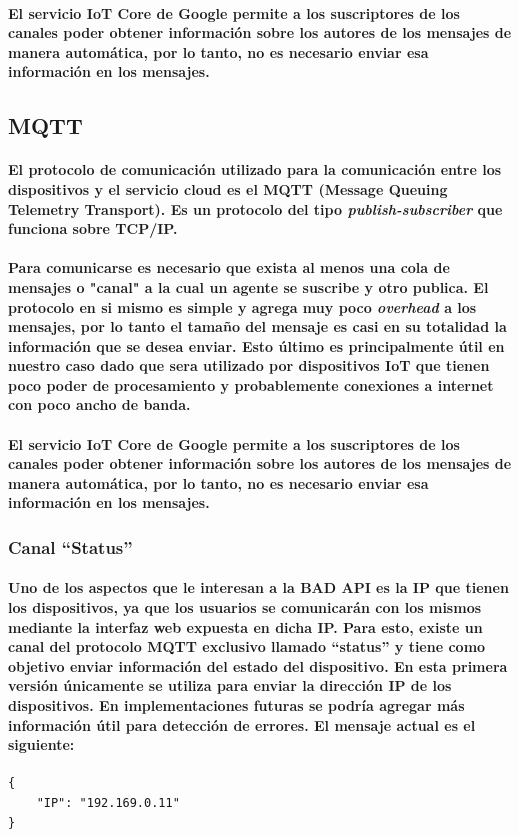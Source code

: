 \documentclass{article}
\begin{document}
\paragraph{
El servicio IoT Core de Google permite a los suscriptores de los canales poder obtener información sobre los autores de los mensajes de manera automática, por lo tanto, no es necesario enviar esa información en los mensajes.
}

\subsection{MQTT}
\paragraph{
El protocolo de comunicación utilizado para la comunicación entre los dispositivos y el servicio cloud es el MQTT (Message Queuing Telemetry Transport). Es un protocolo del tipo \textit{publish-subscriber} que funciona sobre TCP/IP.
}
\paragraph{
Para comunicarse es necesario que exista al menos una cola de mensajes o "canal" a la cual un agente se suscribe y otro publica. El protocolo en si mismo es simple y agrega muy poco \textit{overhead} a los mensajes, por lo tanto el tamaño del mensaje es casi en su totalidad la información que se desea enviar. Esto último es principalmente útil en nuestro caso dado que sera utilizado por dispositivos IoT que tienen poco poder de procesamiento y probablemente conexiones a internet con poco ancho de banda.
}
\paragraph{
El servicio IoT Core de Google permite a los suscriptores de los canales poder obtener información sobre los autores de los mensajes de manera automática, por lo tanto, no es necesario enviar esa información en los mensajes.
}

\subsubsection{Canal “Status”}
\paragraph{
Uno de los aspectos que le interesan a la BAD API es la IP que tienen los dispositivos, ya que los usuarios se comunicarán con los mismos mediante la interfaz web expuesta en dicha IP. Para esto, existe un canal del protocolo MQTT exclusivo llamado “status” y tiene como objetivo enviar información del estado del dispositivo. En esta primera versión únicamente se utiliza para enviar la dirección IP de los dispositivos. En implementaciones futuras se podría agregar más información útil para detección de errores. El mensaje actual es el siguiente:
}
\begin{verbatim}
{
    "IP": "192.169.0.11"
}
\end{verbatim}
\end{document}
